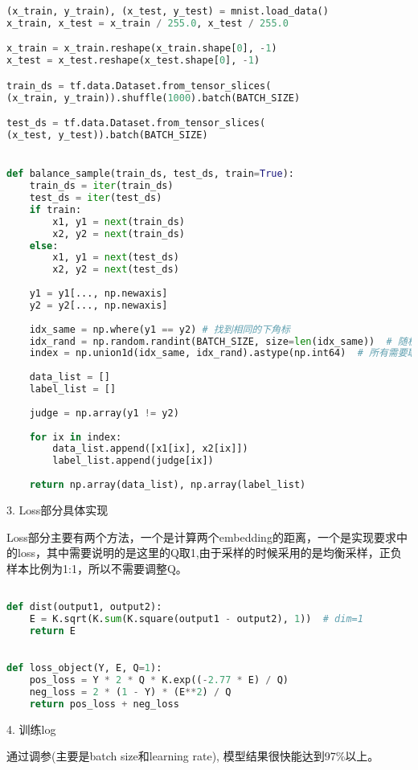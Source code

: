 \documentclass{article}
\begin{document}
  	
\begin{lstlisting}[language=Python]
(x_train, y_train), (x_test, y_test) = mnist.load_data()
x_train, x_test = x_train / 255.0, x_test / 255.0

x_train = x_train.reshape(x_train.shape[0], -1)
x_test = x_test.reshape(x_test.shape[0], -1)

train_ds = tf.data.Dataset.from_tensor_slices(
(x_train, y_train)).shuffle(1000).batch(BATCH_SIZE)

test_ds = tf.data.Dataset.from_tensor_slices(
(x_test, y_test)).batch(BATCH_SIZE)


def balance_sample(train_ds, test_ds, train=True):
	train_ds = iter(train_ds)
	test_ds = iter(test_ds)
	if train:
		x1, y1 = next(train_ds)
		x2, y2 = next(train_ds)
	else:
		x1, y1 = next(test_ds)
		x2, y2 = next(test_ds)
		
	y1 = y1[..., np.newaxis]
	y2 = y2[..., np.newaxis]
	
	idx_same = np.where(y1 == y2) # 找到相同的下角标
	idx_rand = np.random.randint(BATCH_SIZE, size=len(idx_same))  # 随机取样
	index = np.union1d(idx_same, idx_rand).astype(np.int64)  # 所有需要取样的样本
	
	data_list = []
	label_list = []
	
	judge = np.array(y1 != y2)
	
	for ix in index:
		data_list.append([x1[ix], x2[ix]])
		label_list.append(judge[ix])
		
	return np.array(data_list), np.array(label_list)
\end{lstlisting}

	3. Loss部分具体实现
	
	Loss部分主要有两个方法，一个是计算两个embedding的距离，一个是实现要求中的loss，其中需要说明的是这里的Q取1,由于采样的时候采用的是均衡采样，正负样本比例为1:1，所以不需要调整Q。
	
\begin{lstlisting}[language=Python]

def dist(output1, output2):
	E = K.sqrt(K.sum(K.square(output1 - output2), 1))  # dim=1
	return E
	

def loss_object(Y, E, Q=1):
	pos_loss = Y * 2 * Q * K.exp((-2.77 * E) / Q)
	neg_loss = 2 * (1 - Y) * (E**2) / Q
	return pos_loss + neg_loss

\end{lstlisting}

	
	4. 训练log
	
	通过调参(主要是batch size和learning rate), 模型结果很快能达到97\%以上。
	
\end{document}
